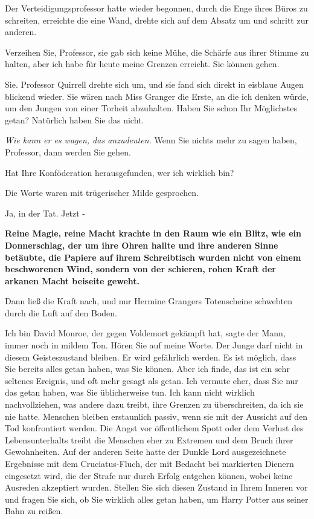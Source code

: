 Der Verteidigungsprofessor hatte wieder begonnen, durch die Enge ihres Büros zu
schreiten, erreichte die eine Wand, drehte sich auf dem Absatz um und schritt
zur anderen.

\glqq Verzeihen Sie, Professor\grqq{}, sie gab sich keine Mühe, die Schärfe aus
ihrer Stimme zu halten, \glqq aber ich habe für heute meine Grenzen erreicht.
Sie können gehen.\grqq{}

\glqq Sie.\grqq{} Professor Quirrell drehte sich um, und sie fand sich direkt in
eisblaue Augen blickend wieder. \glqq Sie wären nach Miss Granger die Erste, an
die ich denken würde, um den Jungen von einer Torheit abzuhalten. Haben Sie
schon Ihr Möglichstes getan? Natürlich haben Sie das nicht.\grqq{}

\emph{Wie kann er es wagen, das anzudeuten. }
\glqq Wenn Sie nichts mehr zu sagen haben, Professor, dann werden Sie
gehen.\grqq{}

\glqq Hat Ihre Konföderation herausgefunden, wer ich wirklich bin?\grqq{}

Die Worte waren mit trügerischer Milde gesprochen.

\glqq Ja, in der Tat. Jetzt -\grqq{}

\textbf{Reine Magie, reine Macht krachte in den Raum wie ein Blitz, wie ein Donnerschlag, der um ihre Ohren hallte und ihre anderen Sinne betäubte, die Papiere auf ihrem Schreibtisch wurden nicht von einem beschworenen Wind, sondern von der schieren, rohen Kraft der arkanen Macht beiseite geweht. }

Dann ließ die Kraft nach, und nur Hermine Grangers Totenscheine schwebten durch
die Luft auf den Boden.

\glqq Ich bin David Monroe, der gegen Voldemort gekämpft hat\grqq{}, sagte der
Mann, immer noch in mildem Ton. \glqq Hören Sie auf meine Worte. Der Junge darf
nicht in diesem Geisteszustand bleiben. Er wird gefährlich werden. Es ist
möglich, dass Sie bereits alles getan haben, was Sie können. Aber ich finde, das
ist ein sehr seltenes Ereignis, und oft mehr gesagt als getan. Ich vermute eher,
dass Sie nur das getan haben, was Sie üblicherweise tun. Ich kann nicht wirklich
nachvollziehen, was andere dazu treibt, ihre Grenzen zu überschreiten, da ich
sie nie hatte. Menschen bleiben erstaunlich passiv, wenn sie mit der Aussicht
auf den Tod konfrontiert werden. Die Angst vor öffentlichem Spott oder dem
Verlust des Lebensunterhalts treibt die Menschen eher zu Extremen und dem Bruch
ihrer Gewohnheiten. Auf der anderen Seite hatte der Dunkle Lord ausgezeichnete
Ergebnisse mit dem Cruciatus-Fluch, der mit Bedacht bei markierten Dienern
eingesetzt wird, die der Strafe nur durch Erfolg entgehen können, wobei keine
Ausreden akzeptiert wurden. Stellen Sie sich diesen Zustand in Ihrem Inneren vor
und fragen Sie sich, ob Sie wirklich alles getan haben, um Harry Potter aus
seiner Bahn zu reißen.\grqq{}

